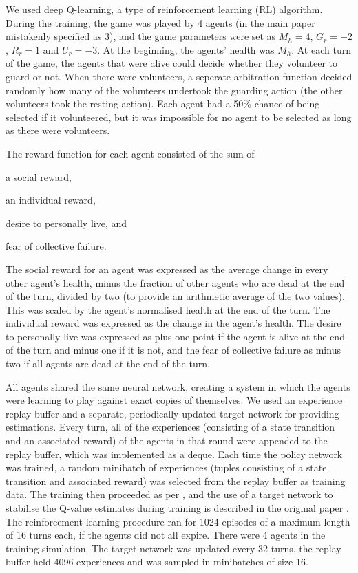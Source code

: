We used deep Q-learning, a type of reinforcement learning (RL) algorithm.
During the training, the game was played by 4 agents (in the main paper
mistakenly specified as 3), and the game parameters were set as $M_h = 4$,
$G_r = -2$, $R_r = 1$ and $U_r = -3$.
%
At the beginning, the agents' health was $M_h$.
%
At each turn of the game, the agents that were alive could decide whether they
volunteer to guard or not. When there were volunteers, a seperate arbitration
function decided randomly how many of the volunteers undertook the guarding
action (the other volunteers took the resting action). Each agent had a 50\%
chance of being selected if it volunteered, but it was impossible for no agent
to be selected as long as there were volunteers.

The reward function for each agent consisted of the sum of
\begin{inparaenum}[\it (i)]
\item  a social reward,
\item an individual reward,
\item desire to personally live, and
\item fear of collective failure.
\end{inparaenum}
The social reward for an agent was expressed as the average change in every
other agent's health, minus the fraction of other agents who are dead at the
end of the turn, divided by two (to provide an arithmetic average of the two
values). This was scaled by the agent's normalised health at the end of the
turn. The individual reward was expressed as the change in the agent's health.
The desire to personally live was expressed as plus one point if the agent is
alive at the end of the turn and minus one if it is not, and the fear of
collective failure as minus two if all agents are dead at the end of the turn.



All agents shared the same neural network, creating a system in which the
agents were learning to play against exact copies of themselves.
%
We used an experience replay buffer and a separate, periodically updated target
network for providing estimations.
%
Every turn, all of the experiences (consisting of a state transition and an
associated reward) of the agents in that round were appended to the replay
buffer, which was implemented as a deque. 
%
Each time the policy network was trained, a random minibatch of experiences
(tuples consisting of a state transition and associated reward) was selected
from the replay buffer as training data.
%
The training then proceeded as per \cite{Mnih+15}, and the use of a target
network to stabilise the Q-value estimates during training is described in
the original paper \cite{HaaseltGS16}.
%
The reinforcement learning procedure ran for 1024 episodes of a maximum length
of 16 turns each, if the agents did not all expire. There were 4 agents in the
training simulation. The target network was updated every 32 turns, the replay
buffer held 4096 experiences and was sampled in minibatches of size 16.

